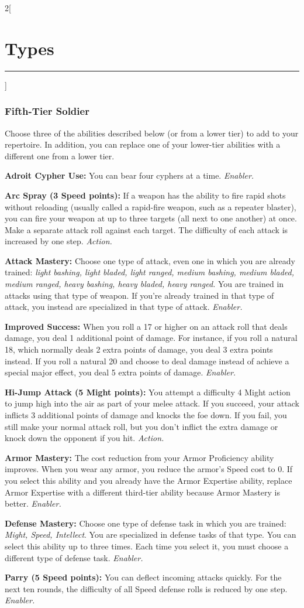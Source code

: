 \documentclass[a4paper,10pt,final]{book}
\newcommand{\HRule}{\rule{\linewidth}{0.5mm}} %
\newcommand{\newSection}[1]{\section*{#1} \addcontentsline{toc}{section}{#1} \label{sec:#1} \HRule}
\newcommand{\itemAbility}[2]{\textcolor{25gray}{\textbullet\textbf{ #1:}} {#2}\par}
\newcommand{\enabler}{\textit{ Enabler.}}
\newcommand{\action}{\textit{ Action.}}
\newenvironment{docsection}[1]
{
  \begin{multicols*}{2}[\newSection{#1}]
}
{
  \end{multicols*}
  \newpage
}
\begin{document}
\begin{docsection}{Types}
\subsubsection*{Fifth-Tier Soldier}
\label{subsub:soldierFifthTier}
Choose three of the abilities described below (or from a lower tier) to add to your repertoire. In addition, you can replace one of your lower-tier abilities with a different one from a lower tier.\par
\itemAbility{Adroit Cypher Use}{You can bear four
cyphers at a time.\enabler}
\itemAbility{Arc Spray (3 Speed points)}{If a weapon
has the ability to fire rapid shots without
reloading (usually called a rapid-fire
weapon, such as a repeater blaster), you
can fire your weapon at up to three targets
(all next to one another) at once. Make a
separate attack roll against each target. The
difficulty of each attack is increased by one
step.\action}
\itemAbility{Attack Mastery}{Choose one
type of attack, even one in which you are
already trained: \textit{light bashing, light bladed,
light ranged, medium bashing, medium
bladed, medium ranged, heavy bashing,
heavy bladed, heavy ranged.} You are
trained in attacks using that type of weapon.
If you’re already trained in that type of
attack, you instead are specialized in that
type of attack.\enabler}
\itemAbility{Improved Success}{When you roll a 17 or
higher on an attack roll that deals damage,
you deal 1 additional point of damage. For
instance, if you roll a natural 18, which
normally deals 2 extra points of damage,
you deal 3 extra points instead. If you roll
a natural 20 and choose to deal damage
instead of achieve a special major effect,
you deal 5 extra points of damage.\enabler}
\itemAbility{Hi-Jump Attack (5 Might points)}{You attempt
a difficulty 4 Might action to jump high into
the air as part of your melee attack. If you
succeed, your attack inflicts 3 additional
points of damage and knocks the foe down.
If you fail, you still make your normal attack
roll, but you don’t inflict the extra damage or
knock down the opponent if you hit.\action}
\itemAbility{Armor Mastery}{The cost reduction
from your Armor Proficiency ability
improves. When you wear any armor, you
reduce the armor’s Speed cost to 0. If you
select this ability and you already have the
Armor Expertise ability, replace
Armor Expertise with a different
third-tier ability because Armor Mastery is better.\enabler}
\itemAbility{Defense Mastery}{Choose one
type of defense task in which you are
trained: \textit{Might, Speed, Intellect}. You are
specialized in defense tasks of that type.
You can select this ability up to three times.
Each time you select it, you must choose a
different type of defense task.\enabler}
\itemAbility{Parry (5 Speed points)}{You can deflect
incoming attacks quickly. For the next ten
rounds, the difficulty of all Speed defense
rolls is reduced by one step.\enabler}


\end{docsection}
\end{document}
